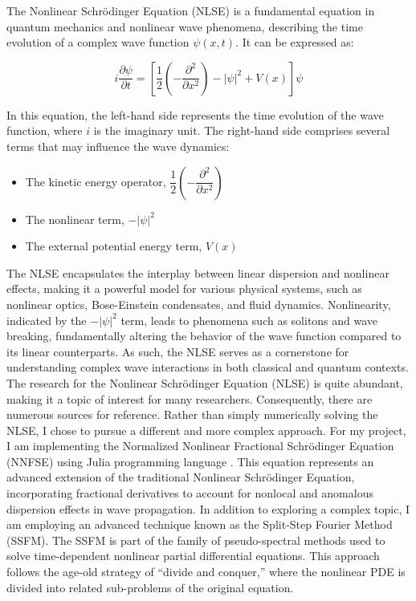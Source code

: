 \documentclass[8pt, a4paper, twocolumn]{article}
\begin{document}
The Nonlinear Schrödinger Equation (NLSE) is a fundamental equation in quantum mechanics and nonlinear wave 
phenomena, describing the time evolution of a complex wave function $\psi(x,t)$. It can be expressed as:

\begin{equation}
	i\frac{\partial\psi}{\partial t} = \left[\frac{1}{2}\left(- \frac{\partial^2}
	{\partial x^2}\right) -|\psi|^2 + V(x)\right] \psi
\end{equation}

In this equation, the left-hand side represents the time evolution of the wave function, where $i$ 
is the imaginary unit. The right-hand side comprises several terms that may influence the wave dynamics: 
\begin{itemize}
	\item The kinetic energy operator, $\dfrac{1}{2}\left(- \dfrac{\partial^2}{\partial x^2}\right)$
	\item The nonlinear term, $-|\psi|^2 $
	\item The external potential energy term, $V(x)$
\end{itemize}

The NLSE encapsulates the interplay between linear dispersion and nonlinear effects, making it a powerful model 
for various physical systems, such as nonlinear optics, Bose-Einstein condensates, and fluid dynamics. 
Nonlinearity, indicated by the $-|\psi|^2$ term, leads to phenomena such as solitons and wave breaking, fundamentally 
altering the behavior of the wave function compared to its linear counterparts. As such, the NLSE serves as a 
cornerstone for understanding complex wave interactions in both classical and quantum contexts.\\

The research for the Nonlinear Schrödinger Equation (NLSE) is quite abundant, making it a topic of interest for 
many researchers. Consequently, there are numerous sources for reference. Rather than simply numerically 
solving the NLSE, I chose to pursue a different and more complex approach. For my project, I am implementing 
the Normalized Nonlinear Fractional Schrödinger Equation (NNFSE) using Julia programming language \cite{bezanson2017julia}. 
This equation represents an advanced extension 
of the traditional Nonlinear Schrödinger Equation, incorporating fractional derivatives to account for 
nonlocal and anomalous dispersion effects in wave propagation. In addition to exploring a complex
topic, I am employing an advanced technique known as the Split-Step Fourier Method (SSFM). The SSFM is part of 
the family of pseudo-spectral methods used to solve time-dependent nonlinear partial differential equations. 
This approach follows the age-old strategy of ``divide and conquer,'' where the nonlinear PDE is divided into 
related sub-problems of the original equation.
\end{document}

